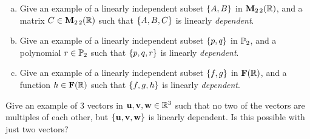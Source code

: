 \begin{prob}
\begin{enumerate}[a)]
\item Give an example of a linearly independent subset $\{A, B \}$ in $\mathbf{M}_{2 \,2}(\mathbb{R})$, and a matrix $C\in  \mathbf{M}_{2 \,2}(\mathbb{R})$ such that $\{A,B,C \}$ is   linearly {\it dependent}.\medskip
%

\item\sov Give an example of a linearly independent subset $\{p, q \}$ in $\mathbb{P}_2$, and a polynomial $r\in  \mathbb{P}_2$ such that $\{p, q,r \}$ is   linearly {\it dependent}.\medskip

\item Give an example of a linearly independent subset $\{f, g \}$ in $\mathbf{F}(\mathbb{R})$, and a function $h\in   \mathbf{F}(\mathbb{R})$ such that $\{f,g,h \}$ is   linearly {\it dependent}. \medskip
%


\end{enumerate}

\end{prob} \begin{prob} \label{prob07.6} Give an example of 3 vectors in $\mathbf{u},\mathbf{v},\mathbf{w} \in  \mathbb{R}^3$ such that no two of the vectors are multiples of each other, but $\{\mathbf{u},\mathbf{v},\mathbf{w} \}$ is  linearly  dependent. Is this possible with just two vectors?

\end{prob}